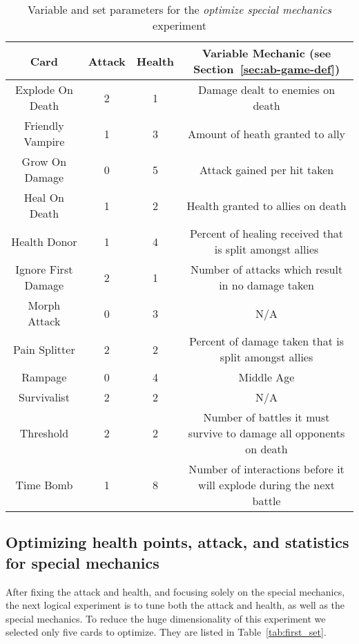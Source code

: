 \begin{table*}[t]
\centering
\begin{tabular}{||c c c c||} 
 \hline
 Card & Attack & Health & Variable Mechanic (see Section~\ref{sec:ab-game-def})\\ [0.5ex] 
 \hline\hline
 Explode On Death & 2 & 1 & Damage dealt to enemies on death \\ 
 \hline
 Friendly Vampire & 1 & 3 & Amount of heath granted to ally \\
 \hline
 Grow On Damage & 0 & 5 & Attack gained per hit taken \\
 \hline
 Heal On Death & 1 & 2 & Health granted to allies on death \\
 \hline
 Health Donor & 1 & 4 & Percent of healing received that is split amongst allies \\
 \hline
 Ignore First Damage & 2 & 1 & Number of attacks which result in no damage taken \\
 \hline
 Morph Attack & 0 & 3 & N/A \\
 \hline
 Pain Splitter & 2 & 2 & Percent of damage taken that is split amongst allies \\
 \hline
 Rampage & 0 & 4 & Middle Age  \\
 \hline
 Survivalist & 2 & 2 & N/A \\
 \hline
 Threshold & 2 & 2 & Number of battles it must survive to damage all opponents on death \\
 \hline
 Time Bomb & 1 & 8 & Number of interactions before it will explode during the next battle \\ 
 \hline
\end{tabular}
\caption{Variable and set parameters for the \textit{optimize special mechanics} experiment}
\label{tab:group_vs_rr_params}
\end{table*}

\subsection{Optimizing health points, attack, and statistics for special mechanics} \label{sec:first_set}

After fixing the attack and health, and focusing solely on the special mechanics, the next logical experiment is to tune both the attack and health, as well as the special mechanics. To reduce the huge dimensionality of this experiment we selected only five cards to optimize. They are listed in Table~\ref{tab:first_set}.

